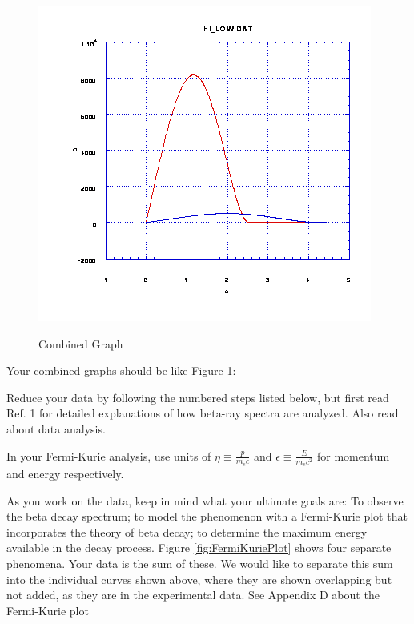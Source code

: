 \documentclass{../lab}
\begin{document}
\begin{figure}[h]
\begin{minipage}{0.32\linewidth}
    \end{minipage} \hfill
    \begin{minipage}{0.32\linewidth}
        \href{http://experimentationlab.berkeley.edu/sites/default/files/images/BRAimage022.gif}{\includegraphics[width=0.8\linewidth]{images/BRAimage022.png}}
    \caption{Combined Graph}
    \label{fig:Combined}
    \end{minipage}
\end{figure}

Your combined graphs should be like Figure \ref{fig:Combined}:



Reduce your data by following the numbered steps listed below, but first read Ref. 1 for detailed explanations of how beta-ray spectra are analyzed. Also read about data analysis.

In your Fermi-Kurie analysis, use units of $\eta \equiv \frac {p}{m_e c}$ and $\epsilon \equiv \frac{E}{m_e c^2}$ for momentum and energy respectively.

As you work on the data, keep in mind what your ultimate goals are: To observe the beta decay spectrum; to model the phenomenon with a Fermi-Kurie plot that incorporates the theory of beta decay; to determine the maximum energy available in the decay process. Figure \ref{fig:FermiKuriePlot} shows four separate phenomena. Your data is the sum of these. We would like to separate this sum into the individual curves shown above, where they are shown overlapping but not added, as they are in the experimental data. See Appendix D about the Fermi-Kurie plot
\end{document}
